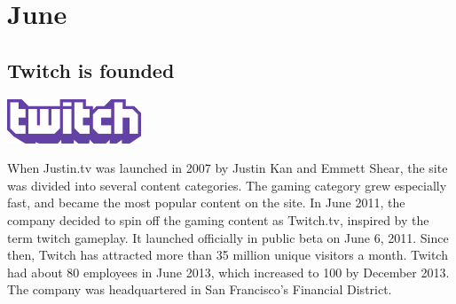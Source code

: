 \documentclass[11pt]{report}
\begin{document}

\section{June}
\subsection{Twitch is founded}
\vspace{2mm}\begin{center}\includegraphics[width=4cm]{./img/twitch.png}\end{center}
When Justin.tv was launched in 2007 by Justin Kan and Emmett Shear, the site was divided into several content categories. The gaming category grew especially fast, and became the most popular content on the site. In June 2011, the company decided to spin off the gaming content as Twitch.tv, inspired by the term twitch gameplay. It launched officially in public beta on June 6, 2011. Since then, Twitch has attracted more than 35 million unique visitors a month. Twitch had about 80 employees in June 2013, which increased to 100 by December 2013. The company was headquartered in San Francisco's Financial District.
\end{document}
